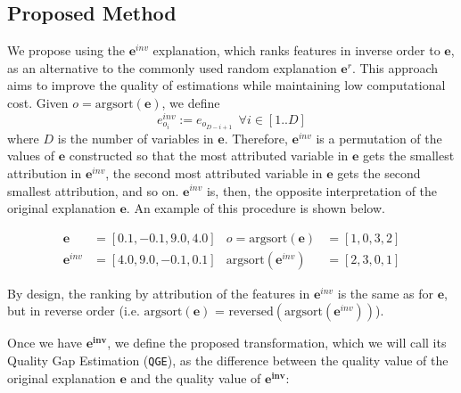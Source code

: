 \subsection{Proposed Method}\label{sec:Proposed_method}
We propose using the $\mathbf{e}^{inv}$ explanation, which ranks features in inverse order to $\mathbf{e}$, as an alternative to the commonly used random explanation $\mathbf{e}^r$. This approach aims to improve the quality of estimations while maintaining low computational cost. Given $o = \text{argsort}(\mathbf{e})$, we define
\begin{equation}
\label{eq:e_inv}
    e^{inv}_{o_i} := e_{o_{D-i+1}}~~\forall{i} \in \left[1..D\right]
\end{equation}
where $D$ is the number of variables in $\mathbf{e}$.
Therefore, $\mathbf{e}^{inv}$ is a permutation of the values of $\mathbf{e}$ constructed so that the most attributed variable in $\mathbf{e}$ gets the smallest attribution in $\mathbf{e}^{inv}$, the second most attributed variable in $\mathbf{e}$ gets the second smallest attribution, and so on. $\mathbf{e}^{inv}$ is, then, the opposite interpretation of the original explanation $\mathbf{e}$. An example of this procedure is shown below.%

  \begin{minipage}{\columnwidth}
    \begin{align*}
    \mathbf{e} &= [0.1, -0.1, 9.0, 4.0]  & o=\text{argsort}(\mathbf{e}) &= [1, 0, 3, 2] \\
    \mathbf{e}^{inv} &= [4.0, 9.0, -0.1, 0.1]  & \text{argsort}(\mathbf{e}^{inv}) &= [2, 3, 0, 1]
    \end{align*}
  \end{minipage}
By design, the ranking by attribution of the features in $\mathbf{e}^{inv}$ is the same as for $\mathbf{e}$, but in reverse order (i.e. $\text{argsort}(\mathbf{e})$ = $\text{reversed}(\text{argsort}(\mathbf{e}^{inv}))$).

Once we have $\mathbf{e^{inv}}$, we define the proposed transformation, which we will call its Quality Gap Estimation (\texttt{QGE}), as the difference between the quality value of the original explanation $\mathbf{e}$ and the quality value of $\mathbf{e^{inv}}$:

